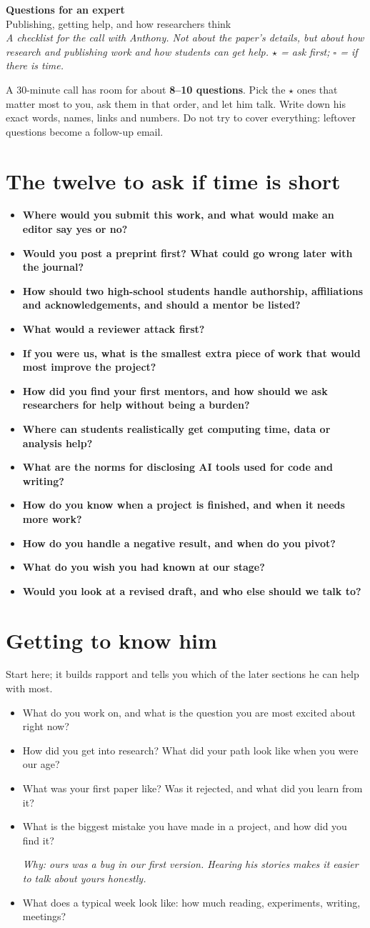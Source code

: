 \documentclass[10.5pt]{article}
\newcommand{\Q}[1]{\item[$\square$] #1}
\newcommand{\QS}[1]{\item[\textbf{$\star$}] \textbf{#1}}
\newcommand{\why}[1]{\par{\small\itshape\color{note}Why: #1}}
\begin{document}
{\LARGE\textbf{Questions for an expert}}\\[2pt]
{\large Publishing, getting help, and how researchers think}\\[2pt]
\textit{A checklist for the call with Anthony. Not about the paper's details, but about how research and
publishing work and how students can get help. $\star$ = ask first; $\square$ = if there is time.}

\begin{callout}[title={\textbf{How to use this list}}]
A 30-minute call has room for about \textbf{8--10 questions}. Pick the $\star$ ones that matter most to you,
ask them in that order, and let him talk. Write down his exact words, names, links and numbers. Do not try to
cover everything: leftover questions become a follow-up email.
\end{callout}

\section{The twelve to ask if time is short}
\begin{itemize}
\QS{Where would you submit this work, and what would make an editor say yes or no?}
\QS{Would you post a preprint first? What could go wrong later with the journal?}
\QS{How should two high-school students handle authorship, affiliations and acknowledgements, and should a mentor be listed?}
\QS{What would a reviewer attack first?}
\QS{If you were us, what is the smallest extra piece of work that would most improve the project?}
\QS{How did you find your first mentors, and how should we ask researchers for help without being a burden?}
\QS{Where can students realistically get computing time, data or analysis help?}
\QS{What are the norms for disclosing AI tools used for code and writing?}
\QS{How do you know when a project is finished, and when it needs more work?}
\QS{How do you handle a negative result, and when do you pivot?}
\QS{What do you wish you had known at our stage?}
\QS{Would you look at a revised draft, and who else should we talk to?}
\end{itemize}

\section{Getting to know him}
Start here; it builds rapport and tells you which of the later sections he can help with most.
\begin{itemize}
\Q{What do you work on, and what is the question you are most excited about right now?}
\Q{How did you get into research? What did your path look like when you were our age?}
\Q{What was your first paper like? Was it rejected, and what did you learn from it?}
\Q{What is the biggest mistake you have made in a project, and how did you find it?}
\why{ours was a bug in our first version. Hearing his stories makes it easier to talk about yours honestly.}
\Q{What does a typical week look like: how much reading, experiments, writing, meetings?}
\end{itemize}
\end{document}
